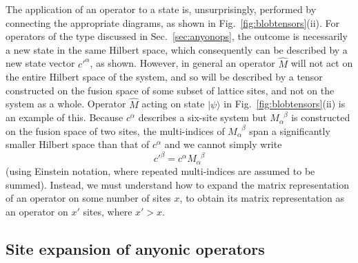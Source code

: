 \documentclass[aps,prb,reprint,superscriptaddress,amsfonts,amsmath,amssymb,showpacs,floatfix]{revtex4-1}
\newcommand{\fref}[1]{Fig.~\ref{#1}}
\newcommand{\sref}[1]{Sec.~\ref{#1}}
\newcommand{\ra}{\rangle}
\newcommand{\p}[1]{\phantom{#1}}
\newcommand{\Mop}{M_\alpha^{\p{\alpha}\beta}}
\begin{document}
The application of an operator to a state is, unsurprisingly, performed by connecting the appropriate diagrams, as shown in \fref{fig:blobtensors}(ii). For operators of the type discussed in \sref{sec:anyonops}, the outcome is necessarily a new state in the same Hilbert space, which consequently can be described by a new state vector $c'^\alpha$, as shown. However, in general an operator $\hat M$ will not act on the entire Hilbert space of the system, and so will be described by a tensor constructed on the fusion space of some subset of lattice sites, and not on the system as a whole. Operator $\hat M$ acting on state $|\psi\ra$ in \fref{fig:blobtensors}(ii) is an example of this. Because $c^\alpha$ describes a six-site system but $\Mop$ is constructed on the fusion space of two sites, 
the multi-indices of $\Mop$ span a significantly smaller Hilbert space than that of $c^\alpha$ and we cannot simply write 
\begin{equation}
c'^\beta = c^{\alpha}M_\alpha^{\phantom{\alpha}\beta}
\end{equation}
(using Einstein notation, where repeated multi-indices are assumed to be summed).
Instead, we must understand how to expand the matrix representation of an operator on some number of sites $x$, to obtain its matrix representation as an operator on $x'$ sites, where $x'>x$. 



\subsection{Site expansion of anyonic operators\label{sec:siteexpanyop}}
\end{document}
